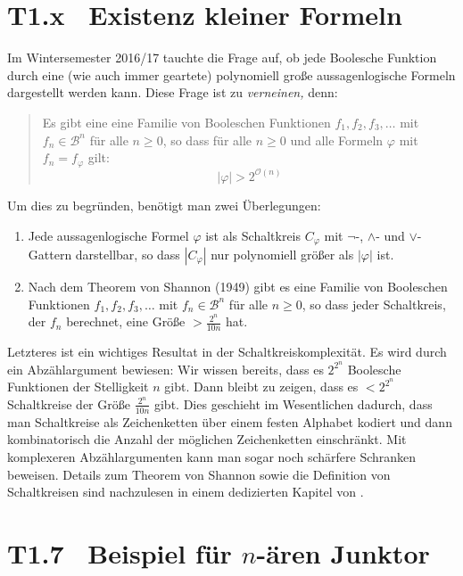 \documentclass[fontsize=11pt, twoside=false, numbers=autoenddot]{scrbook}
\begin{document}
\section*{T1.x~ Existenz kleiner Formeln}

Im Wintersemester 2016/17 tauchte die Frage auf, ob jede Boolesche Funktion
durch eine (wie auch immer geartete) polynomiell große aussagenlogische Formeln dargestellt werden kann.
Diese Frage ist zu \emph{verneinen,} denn:

\begin{quote}
  Es gibt eine eine Familie von Booleschen Funktionen $f_1,f_2,f_3,\dots$
  mit $f_n \in \mathcal{B}^n$ für alle $n \geq 0$,
  so dass für alle $n \geq 0$ und alle Formeln $\varphi$ mit $f_n = f_\varphi$ gilt:
  \[
    |\varphi| > 2^{\mathcal{O}(n)}
  \]
\end{quote}

Um dies zu begründen, benötigt man zwei Überlegungen:
\begin{enumerate}
  \item
    Jede aussagenlogische Formel $\varphi$
    ist als Schaltkreis $C_\varphi$ mit
    $\neg$-, $\land$- und $\lor$-Gattern darstellbar,
    so dass $|C_\varphi|$ nur polynomiell größer als $|\varphi|$ ist.
  \item
    Nach dem Theorem von Shannon (1949) gibt es
    eine Familie von Booleschen Funktionen $f_1,f_2,f_3,\dots$
    mit $f_n \in \mathcal{B}^n$ für alle $n \geq 0$,
    so dass jeder Schaltkreis, der $f_n$ berechnet, eine Größe ${}> \frac{2^n}{10n}$ hat.
\end{enumerate}
Letzteres ist ein wichtiges Resultat in der Schaltkreiskomplexität.
Es wird durch ein Abzählargument bewiesen:
Wir wissen bereits, dass es $2^{2^n}$ Boolesche Funktionen der Stelligkeit $n$ gibt.
Dann bleibt zu zeigen, dass es ${}<2^{2^n}$ Schaltkreise der Größe $\frac{2^n}{10n}$ gibt.
Dies geschieht im Wesentlichen dadurch, dass man Schaltkreise als Zeichenketten
über einem festen Alphabet kodiert und dann kombinatorisch die Anzahl der
möglichen Zeichenketten einschränkt.
Mit komplexeren Abzählargumenten kann man sogar noch schärfere Schranken beweisen.
Details zum Theorem von Shannon sowie die Definition von Schaltkreisen sind nachzulesen in 
einem dedizierten Kapitel von \cite{AB09}.

\section*{T1.7~ Beispiel für {\boldmath $n$-ären} Junktor}
\end{document}
